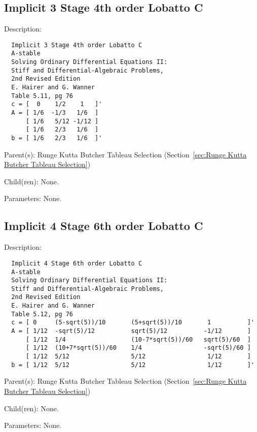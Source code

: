 \subsection{Implicit 3 Stage 4th order Lobatto C}
\label{sec:Implicit 3 Stage 4th order Lobatto C}

\begin{list}{}
  {\setlength{\leftmargin}{1.0in}
   \setlength{\labelwidth}{0.75in}
   \setlength{\labelsep}{0.125in}}
  \item[Description:]
\begin{verbatim}
  Implicit 3 Stage 4th order Lobatto C
  A-stable
  Solving Ordinary Differential Equations II:
  Stiff and Differential-Algebraic Problems,
  2nd Revised Edition
  E. Hairer and G. Wanner
  Table 5.11, pg 76
  c = [  0    1/2    1   ]'
  A = [ 1/6  -1/3   1/6  ]
      [ 1/6   5/12 -1/12 ]
      [ 1/6   2/3   1/6  ]
  b = [ 1/6   2/3   1/6  ]'
\end{verbatim}
  \item[Parent(s):]
    Runge Kutta Butcher Tableau Selection (Section~\ref{sec:Runge Kutta Butcher Tableau Selection})
  \item[Child(ren):]
    None. 
  \item[Parameters:]
    None. 
\end{list}

\subsection{Implicit 4 Stage 6th order Lobatto C}
\label{sec:Implicit 4 Stage 6th order Lobatto C}

\begin{list}{}
  {\setlength{\leftmargin}{1.0in}
   \setlength{\labelwidth}{0.75in}
   \setlength{\labelsep}{0.125in}}
  \item[Description:]
\begin{verbatim}
  Implicit 4 Stage 6th order Lobatto C
  A-stable
  Solving Ordinary Differential Equations II:
  Stiff and Differential-Algebraic Problems,
  2nd Revised Edition
  E. Hairer and G. Wanner
  Table 5.12, pg 76
  c = [ 0     (5-sqrt(5))/10       (5+sqrt(5))/10       1          ]'
  A = [ 1/12  -sqrt(5)/12          sqrt(5)/12          -1/12       ]
      [ 1/12  1/4                  (10-7*sqrt(5))/60   sqrt(5)/60  ]
      [ 1/12  (10+7*sqrt(5))/60    1/4                 -sqrt(5)/60 ]
      [ 1/12  5/12                 5/12                 1/12       ]
  b = [ 1/12  5/12                 5/12                 1/12       ]'
\end{verbatim}
  \item[Parent(s):]
    Runge Kutta Butcher Tableau Selection (Section~\ref{sec:Runge Kutta Butcher Tableau Selection})
  \item[Child(ren):]
    None. 
  \item[Parameters:]
    None. 
\end{list}

